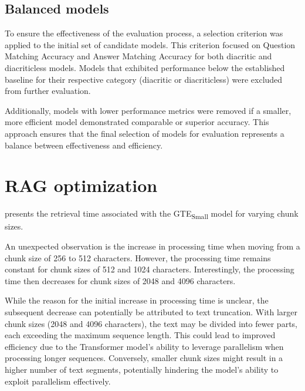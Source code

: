 \FloatBarrier



\FloatBarrier

\subsection{Balanced models}
To ensure the effectiveness of the evaluation process, a selection criterion was applied to the initial set of candidate models.
This criterion focused on Question Matching Accuracy and Answer Matching Accuracy for both diacritic and diacriticless models.
Models that exhibited performance below the established baseline for their respective category (diacritic or diacriticless) were excluded from further evaluation.

Additionally, models with lower performance metrics were removed if a smaller, more efficient model demonstrated comparable or superior accuracy.
This approach ensures that the final selection of models for evaluation represents a balance between effectiveness and efficiency.



\section{\ac{RAG} optimization}

 presents the retrieval time associated with the \ac{GTE}\textsubscript{Small} model for varying chunk sizes.



An unexpected observation is the increase in processing time when moving from a chunk size of 256 to 512 characters.
However, the processing time remains constant for chunk sizes of 512 and 1024 characters.
Interestingly, the processing time then decreases for chunk sizes of 2048 and 4096 characters.

While the reason for the initial increase in processing time is unclear, the subsequent decrease can potentially be attributed to text truncation.
With larger chunk sizes (2048 and 4096 characters), the text may be divided into fewer parts, each exceeding the maximum sequence length.
This could lead to improved efficiency due to the Transformer model's ability to leverage parallelism when processing longer sequences.
Conversely, smaller chunk sizes might result in a higher number of text segments, potentially hindering the model's ability to exploit parallelism effectively.



